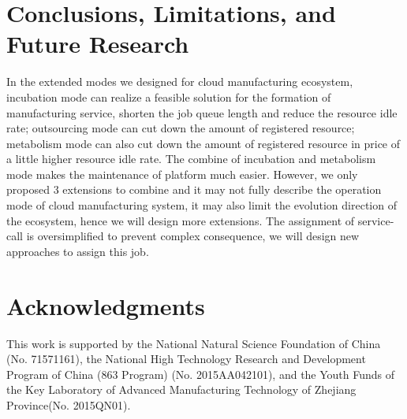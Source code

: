 \section{Conclusions, Limitations, and Future Research} %
\label{sec:contributions_limitations_and_future_research}
In the extended modes we designed for cloud manufacturing ecosystem, incubation mode can realize a feasible solution for the formation of manufacturing service, shorten the job queue length and reduce the resource idle rate; outsourcing mode can cut down the amount of registered resource; metabolism mode can also cut down the amount of registered resource in price of a little higher resource idle rate. The combine of incubation and metabolism mode makes the maintenance of platform much easier.
However, we only proposed 3 extensions to combine and it may not fully describe the operation mode of cloud manufacturing system, it may also limit the evolution direction of the ecosystem, hence we will design more extensions. The assignment of service-call is oversimplified to prevent complex consequence, we will design new approaches to assign this job.

\section{Acknowledgments} %
\label{sec:acknowledgments}
This work is supported by the National Natural Science Foundation of China (No. 71571161), the National High Technology Research and Development Program of China (863 Program) (No. 2015AA042101), and the Youth Funds of the Key Laboratory of Advanced Manufacturing Technology of Zhejiang Province(No. 2015QN01). 

